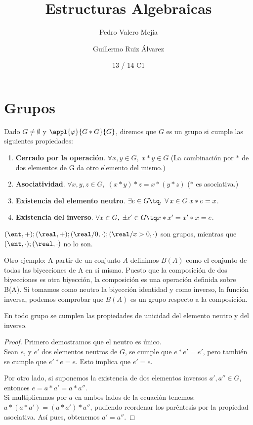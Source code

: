 \documentclass[nochap]{apuntes}
\title{Estructuras Algebraicas}
\author{Pedro Valero Mejía \and Guillermo Ruiz Álvarez}
\date{13 / 14 C1}
\begin{document}
\pagestyle{plain}
\maketitle
\tableofcontents
\newpage

\section{Grupos}

\begin{defn}[Grupo]
Dado $G\neq \emptyset$  y $\appl{\varphi}{G\ast G}{G}$, diremos que $G$ es un grupo si cumple las siguientes propiedades:
\begin{enumerate}
\item \textbf{Cerrado por la operación}. $\forall x, y \in G, \; x \ast y \in G$  (La combinación por $\ast$  de dos elementos de G da otro elemento del mismo.)
\item \textbf{Asociatividad}. $\forall x, y, z \in G, \; (x \ast y) \ast z = x \ast (y \ast z)$ ($\ast$ es asociativa.)
\item \textbf{Existencia del elemento neutro}. $\exists  e \in G \tq ,\; \forall\, x\in G\; x\ast e=x$.
\item \textbf{Existencia del inverso}. $\forall x \in G ,\; \exists x' \in G \tq x\ast x'=x'\ast x=e$.
\end{enumerate}
\end{defn}

\begin{example}
  $ (\ent, +); (\real, +); (\real/0, \cdot); (\real/x>0, \cdot)$ son grupos, mientras que
  $(\ent, \cdot); (\real, \cdot)$ no lo son.

  Otro ejemplo: A partir de un conjunto $A$ definimos $B(A)$ como el conjunto de todas las biyecciones de A en sí mismo.  Puesto que la composición de dos biyecciones es otra biyección, la composición es una operación definida sobre B(A). Si tomamos como neutro la biyección identidad y como inverso, la función inversa, podemos comprobar que $B(A)$ es un grupo respecto a la composición.
\end{example}

\begin{theorem}
  En todo grupo se cumplen las propiedades de unicidad del elemento neutro y del inverso.
\end{theorem}

\begin{proof}
Primero demostramos que el neutro es único. \\
Sean $e$, y $e'$ dos elementos neutros de $G$, se cumple que $e\ast e'=e'$, pero también se cumple que $e'\ast e=e$. Esto implica que $e'=e$.

Por otro lado, si suponemos la existencia de dos elementos inversos $a',a''\in G$, entonces $e=a\ast a'=a\ast a''$. \\
Si multiplicamos por $a$ en ambos lados de la ecuación tenemos: $a\ast (a\ast a')=(a\ast a')\ast a''$, pudiendo reordenar los paréntesis por la
propiedad asociativa. Así pues, obtenemos $a'=a''$.
\end{proof}
\end{document}
